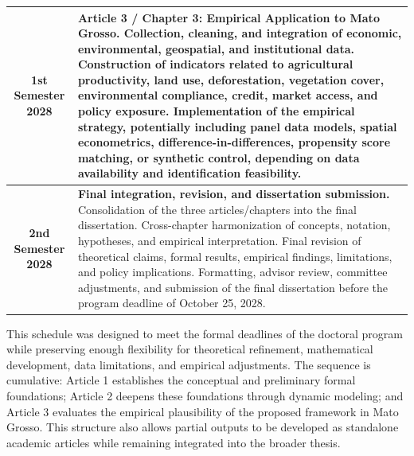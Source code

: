 \begin{table}[H]
\begin{tabularx}{\textwidth}{|c|X|}
\textbf{1st Semester 2028} 
& 
\textbf{Article 3 / Chapter 3: Empirical Application to Mato Grosso.} 
Collection, cleaning, and integration of economic, environmental, geospatial, and institutional data. 
Construction of indicators related to agricultural productivity, land use, deforestation, vegetation cover, environmental compliance, credit, market access, and policy exposure. 
Implementation of the empirical strategy, potentially including panel data models, spatial econometrics, difference-in-differences, propensity score matching, or synthetic control, depending on data availability and identification feasibility. \\
\hline

\textbf{2nd Semester 2028} 
& 
\textbf{Final integration, revision, and dissertation submission.} 
Consolidation of the three articles/chapters into the final dissertation. 
Cross-chapter harmonization of concepts, notation, hypotheses, and empirical interpretation. 
Final revision of theoretical claims, formal results, empirical findings, limitations, and policy implications. 
Formatting, advisor review, committee adjustments, and submission of the final dissertation before the program deadline of October 25, 2028. \\
\hline

\end{tabularx}
\end{table}

This schedule was designed to meet the formal deadlines of the doctoral program while preserving enough flexibility for theoretical refinement, mathematical development, data limitations, and empirical adjustments. The sequence is cumulative: Article 1 establishes the conceptual and preliminary formal foundations; Article 2 deepens these foundations through dynamic modeling; and Article 3 evaluates the empirical plausibility of the proposed framework in Mato Grosso. This structure also allows partial outputs to be developed as standalone academic articles while remaining integrated into the broader thesis.

\newpage

